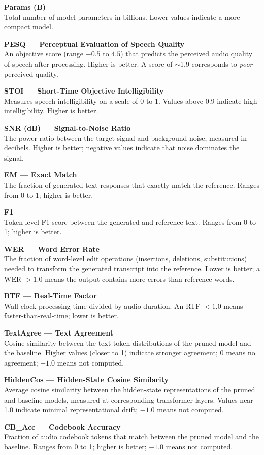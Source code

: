 \documentclass[11pt,a4paper]{article}
\newcommand{\metricbox}[2]{%
  \noindent\textbf{\textcolor{accentblue}{#1}}\\[2pt]#2\par\medskip
}
\begin{document}
\metricbox{Params (B)}{Total number of model parameters in billions. Lower values indicate a more compact model.}

\metricbox{PESQ — Perceptual Evaluation of Speech Quality}{An objective score (range $-0.5$ to $4.5$) that predicts the perceived audio quality of speech after processing. Higher is better. A score of $\sim$1.9 corresponds to \emph{poor} perceived quality.}

\metricbox{STOI — Short-Time Objective Intelligibility}{Measures speech intelligibility on a scale of 0 to 1. Values above 0.9 indicate high intelligibility. Higher is better.}

\metricbox{SNR (dB) — Signal-to-Noise Ratio}{The power ratio between the target signal and background noise, measured in decibels. Higher is better; negative values indicate that noise dominates the signal.}

\metricbox{EM — Exact Match}{The fraction of generated text responses that exactly match the reference. Ranges from 0 to 1; higher is better.}

\metricbox{F1}{Token-level F1 score between the generated and reference text. Ranges from 0 to 1; higher is better.}

\metricbox{WER — Word Error Rate}{The fraction of word-level edit operations (insertions, deletions, substitutions) needed to transform the generated transcript into the reference. Lower is better; a WER $>1.0$ means the output contains more errors than reference words.}


\metricbox{RTF — Real-Time Factor}{Wall-clock processing time divided by audio duration. An RTF $<1.0$ means faster-than-real-time; lower is better.}

\metricbox{TextAgree — Text Agreement}{Cosine similarity between the text token distributions of the pruned model and the baseline. Higher values (closer to 1) indicate stronger agreement; 0 means no agreement; $-1.0$ means not computed.}

\metricbox{HiddenCos — Hidden-State Cosine Similarity}{Average cosine similarity between the hidden-state representations of the pruned and baseline models, measured at corresponding transformer layers. Values near 1.0 indicate minimal representational drift; $-1.0$ means not computed.}

\metricbox{CB\_Acc — Codebook Accuracy}{Fraction of audio codebook tokens that match between the pruned model and the baseline. Ranges from 0 to 1; higher is better; $-1.0$ means not computed.}
\end{document}
